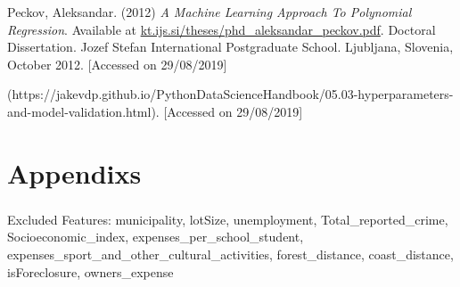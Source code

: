 \documentclass[12pt,a4paper]{article}
\begin{document}
Peckov, Aleksandar. (2012)  \textit{A Machine Learning Approach To Polynomial Regression}. Available at \href{http://kt.ijs.si/theses/phd_aleksandar_peckov.pdf}{kt.ijs.si/theses/phd\_aleksandar\_peckov.pdf}. Doctoral Dissertation. Jozef Stefan International Postgraduate School. Ljubljana, Slovenia, October 2012. [Accessed on 29/08/2019]

(https://jakevdp.github.io/PythonDataScienceHandbook/05.03-hyperparameters-and-model-validation.html). [Accessed on 29/08/2019]

\newpage
\section{Appendixs}
\subsubsection{}
Excluded Features:\newline
municipality, lotSize, unemployment, Total\_reported\_crime, Socioeconomic\_index, expenses\_per\_school\_student, expenses\_sport\_and\_other\_cultural\_activities, forest\_distance, coast\_distance, isForeclosure, owners\_expense
\end{document}
